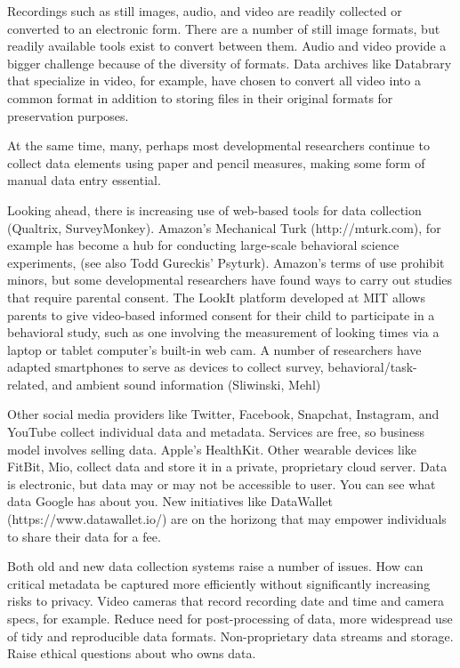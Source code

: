 \documentclass[letterpaper,man,apacite]{apa6}
\begin{document}
Recordings such as still images, audio, and video are readily collected or converted to an electronic form.
There are a number of still image formats, but readily available tools exist to convert between them.
Audio and video provide a bigger challenge because of the diversity of formats.
Data archives like Databrary that specialize in video, for example, have chosen to convert all video into a common format in addition to storing files in their original formats for preservation purposes.

At the same time, many, perhaps most developmental researchers continue to collect data elements using paper and pencil measures, making some form of manual data entry essential.

Looking ahead, there is increasing use of web-based tools for data collection (Qualtrix, SurveyMonkey).
Amazon's Mechanical Turk (http://mturk.com), for example has become a hub for conducting large-scale behavioral science experiments, (see also Todd Gureckis' Psyturk).
Amazon's terms of use prohibit minors, but some developmental researchers have found ways to carry out studies that require parental consent.
The LookIt platform developed at MIT allows parents to give video-based informed consent for their child to participate in a behavioral study, such as one involving the measurement of looking times via a laptop or tablet computer's built-in web cam.
A number of researchers have adapted smartphones to serve as devices to collect survey, behavioral/task-related, and ambient sound information (Sliwinski, Mehl)

Other social media providers like Twitter, Facebook, Snapchat, Instagram, and YouTube collect individual data and metadata.
Services are free, so business model involves selling data.
Apple's HealthKit.
Other wearable devices like FitBit, Mio, collect data and store it in a private, proprietary cloud server.
Data is electronic, but data may or may not be accessible to user.
You can see what data Google has about you.
New initiatives like DataWallet (https://www.datawallet.io/) are on the horizong that may empower individuals to share their data for a fee.

Both old and new data collection systems raise a number of issues.
How can critical metadata be captured more efficiently without significantly increasing risks to privacy.
Video cameras that record recording date and time and camera specs, for example.
Reduce need for post-processing of data, more widespread use of tidy and reproducible data formats.
Non-proprietary data streams and storage.
Raise ethical questions about who owns data.
\end{document}
